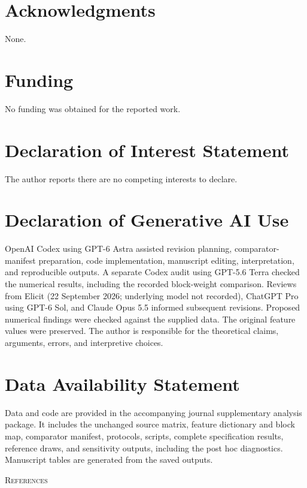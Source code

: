 \documentclass[12pt]{article}
\newif\ifcjlsubmission
\begin{document}
\ifcjlsubmission
\else
\begingroup
\singlespacing
\section*{Acknowledgments}
None.

\section*{Funding}
No funding was obtained for the reported work.

\section*{Declaration of Interest Statement}
The author reports there are no competing interests to declare.

\section*{Declaration of Generative AI Use}
OpenAI Codex using GPT-6 Astra assisted revision planning, comparator-manifest preparation, code implementation, manuscript editing, interpretation, and reproducible outputs. A separate Codex audit using GPT-5.6 Terra checked the numerical results, including the recorded block-weight comparison. Reviews from Elicit (22 September 2026; underlying model not recorded), ChatGPT Pro using GPT-6 Sol, and Claude Opus 5.5 informed subsequent revisions. Proposed numerical findings were checked against the supplied data. The original feature values were preserved. The author is responsible for the theoretical claims, arguments, errors, and interpretive choices.

\section*{Data Availability Statement}
Data and code are provided in the accompanying journal supplementary analysis package. It includes the unchanged source matrix, feature dictionary and block map, comparator manifest, protocols, scripts, complete specification results, reference draws, and sensitivity outputs, including the post hoc diagnostics. Manuscript tables are generated from the saved outputs.

\endgroup
\clearpage
{\centering\textsc{References}}
\begin{sloppypar}
\printbibliography[heading=none]
\end{sloppypar}
\end{document}
